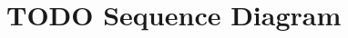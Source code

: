 \begin{table}[H]
\begin{tabular}{p{0.27\linewidth}  p{0.67\linewidth}}
\end{tabular}
\end{table}


\newpage
\section{TODO Sequence Diagram}